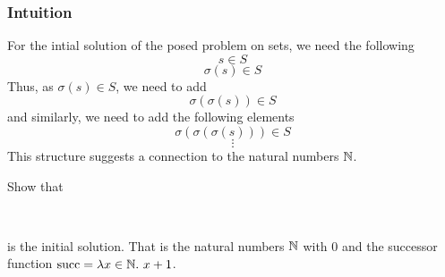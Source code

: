 \subsubsection{Intuition}
For the intial solution of the posed problem on sets, we need the following
\[s \in S \]
\[\sigma(s) \in S \]
Thus, as $\sigma(s) \in S$, we need to add
\[\sigma(\sigma(s)) \in S\]
and similarly, we need to add the following elements
\[\sigma(\sigma(\sigma(s))) \in S\]
\[\vdots\]
This structure suggests a connection to the natural numbers $\mathbb{N}$.
\begin{exercise}
    Show that
    \begin{center}
         \\[3mm]
    \end{center}
    is the initial solution. That is the natural numbers $\mathbb{N}$ with 0 and
    the successor function $\mathrm{succ} = \lambda x\in\mathbb{N}.\ x + 1$.
\end{exercise}
